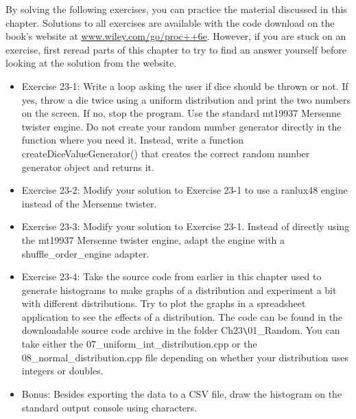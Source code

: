 By solving the following exercises, you can practice the material discussed in this chapter. Solutions to all exercises are available with the code download on the book’s website at \url{www.wiley.com/go/proc++6e}. However, if you are stuck on an exercise, first reread parts of this chapter to try to find an answer yourself before looking at the solution from the website.

\begin{itemize}
\item
Exercise 23-1: Write a loop asking the user if dice should be thrown or not. If yes, throw a die twice using a uniform distribution and print the two numbers on the screen. If no, stop the program. Use the standard mt19937 Mersenne twister engine. Do not create your random number generator directly in the function where you need it. Instead, write a function createDiceValueGenerator() that creates the correct random number generator object and returns it.

\item
Exercise 23-2: Modify your solution to Exercise 23-1 to use a ranlux48 engine instead of the Mersenne twister.

\item
Exercise 23-3: Modify your solution to Exercise 23-1. Instead of directly using the mt19937 Mersenne twister engine, adapt the engine with a shuffle\_order\_engine adapter.

\item
Exercise 23-4: Take the source code from earlier in this chapter used to generate histograms to make graphs of a distribution and experiment a bit with different distributions. Try to plot the graphs in a spreadsheet application to see the effects of a distribution. The code can be found in the downloadable source code archive in the folder Ch23\verb|\|01\_Random. You can take either the 07\_uniform\_int\_distribution.cpp or the 08\_normal\_distribution.cpp file depending on whether your distribution uses integers or doubles.

\item
Bonus: Besides exporting the data to a CSV file, draw the histogram on the standard output console using characters.
\end{itemize}













